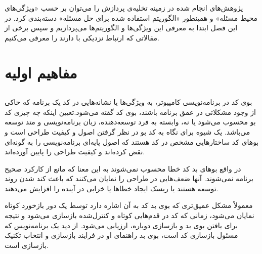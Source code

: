 پژوهش‌های انجام شده در زمینه تخلیه‌ی پردازش را می‌توان بر حسب «ویژگی‌های محیط مسئله» و همینطور «الگوریتم استفاده شده برای حل مسئله» دسته‌بندی کرد. در این فصل ابتدا به معرفی این ویژگی‌ها و الگوریتم‌ها می‌پردازیم و سپس برخی از مقالاتی که ارتباط نزدیکی با \CurrentProject دارند را معرفی می‌کنیم.

\section[مفاهیم اولیه]{مفاهیم اولیه} 
\subsection {}
بوی کد در برنامه‌نویسی کامپیوتر، به ویژگی‌ها یا نشانه‌هایی در کد یک برنامه که حاکی از وجود مشکلاتی در عمق برنامه باشند، بوی کد گفته می‌شود.تعیین اینکه چه چیزی کد بو محسوب می‌شود یا نه، وابسته به فرد توسعه‌دهنده، زبان برنامه‌نویسی و متد توسعه می‌باشد.
یک شیوه برای نگاه به کد بو در نظر گرفتن اصول و کیفیت طراحی است و بوهای کد ساختارهایی مشخص در کد هستند که اصول پایه‌ای برنامه‌نویسی را به گونه‌ای نقض کرده‌اند و کیفیت طراحی را پایین آورده‌اند.

در واقع بوهای بد کد خطا محسوب نمی‌شوند به این معنا که مانع از کارکرد صحیح برنامه نمی‌شوند. آنها ضعف‌هایی در طراحی را نمایان می‌کنند که باعث کند شدن روند توسعه هستند یا ریسک ایجاد خطاها یا خرابی در آینده را افزایش می‌دهند.

معمولاً مشکل عمیق‌تری که بوی بد کد به آن اشاره دارد توسط یک دور بازخورد کوتاه نمایان می‌شود، زمانی که کد در قدم‌هایی کوتاه و کنترل‌شده بازسازی می‌شود و نتیجه برای یافتن بوی بد و بازسازی دوباره، ارزیابی می‌شود. از دید یک برنامه‌نویس که مسئول بازسازی کد است، بوی بد راهنمای او در فرایند بازسازی و انتخاب تکنیک بازسازی است.
